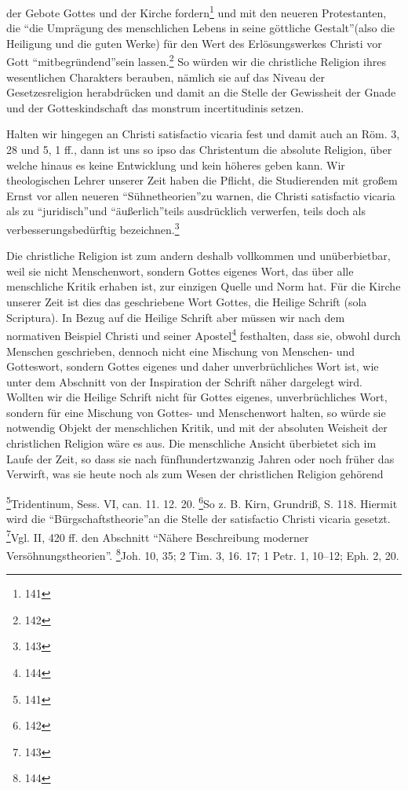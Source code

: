 der Gebote Gottes und der Kirche fordern\footnote{141} und mit den neueren Protestanten, die \textquotedblleft die Umprägung des menschlichen Lebens in seine göttliche Gestalt\textquotedblright (also die Heiligung und die guten Werke) für den Wert des Erlösungswerkes Christi vor Gott \textquotedblleft mitbegründend\textquotedblright sein lassen.\footnote{142} So würden wir die christliche Religion ihres wesentlichen Charakters berauben, nämlich sie auf das Niveau der Gesetzesreligion herabdrücken und damit an die Stelle der Gewissheit der Gnade und der Gotteskindschaft das monstrum incertitudinis setzen.

Halten wir hingegen an Christi satisfactio vicaria fest und damit auch an Röm. 3, 28 und 5, 1 ff., dann ist uns so ipso das Christentum die absolute Religion, über welche hinaus es keine Entwicklung und kein höheres geben kann. Wir theologischen Lehrer unserer Zeit haben die Pflicht, die Studierenden mit großem Ernst vor allen neueren \textquotedblleft Sühnetheorien\textquotedblright zu warnen, die Christi satisfactio vicaria als zu \textquotedblleft juridisch\textquotedblright und \textquotedblleft äußerlich\textquotedblright teils ausdrücklich verwerfen, teils doch als verbesserungsbedürftig bezeichnen.\footnote{143}

Die christliche Religion ist zum andern deshalb vollkommen und unüberbietbar, weil sie nicht Menschenwort, sondern Gottes eigenes Wort, das über alle menschliche Kritik erhaben ist, zur einzigen Quelle und Norm hat. Für die Kirche unserer Zeit ist dies das geschriebene Wort Gottes, die Heilige Schrift (sola Scriptura). In Bezug auf die Heilige Schrift aber müssen wir nach dem normativen Beispiel Christi und seiner Apostel\footnote{144} festhalten, dass sie, obwohl durch Menschen geschrieben, dennoch nicht eine Mischung von Menschen- und Gotteswort, sondern Gottes eigenes und daher unverbrüchliches Wort ist, wie unter dem Abschnitt von der Inspiration der Schrift näher dargelegt wird. Wollten wir die Heilige Schrift nicht für Gottes eigenes, unverbrüchliches Wort, sondern für eine Mischung von Gottes- und Menschenwort halten, so würde sie notwendig Objekt der menschlichen Kritik, und mit der absoluten Weisheit der christlichen Religion wäre es aus. Die menschliche Ansicht überbietet sich im Laufe der Zeit, so dass sie nach fünfhundertzwanzig Jahren oder noch früher das Verwirft, was sie heute noch als zum Wesen der christlichen Religion gehörend

\footnote{141}{Tridentinum, Sess. VI, can. 11. 12. 20.}
\footnote{142}{So z. B. Kirn, Grundriß, S. 118. Hiermit wird die \textquotedblleft Bürgschaftstheorie\textquotedblright an die Stelle der satisfactio Christi vicaria gesetzt.}
\footnote{143}{Vgl. II, 420 ff. den Abschnitt \textquotedblleft Nähere Beschreibung moderner Versöhnungstheorien\textquotedblright.}
\footnote{144}{Joh. 10, 35; 2 Tim. 3, 16. 17; 1 Petr. 1, 10–12; Eph. 2, 20.}